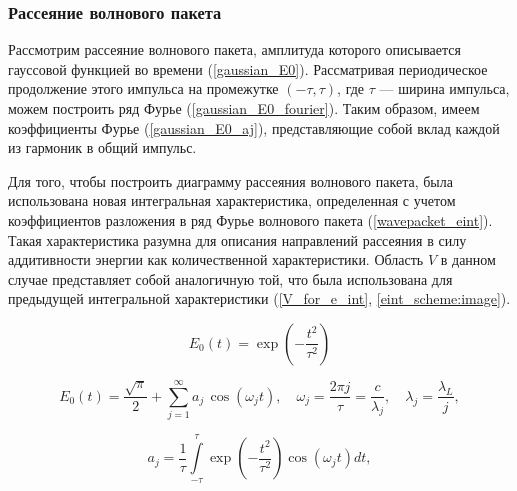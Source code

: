 \subsubsection{Рассеяние волнового пакета}

Рассмотрим рассеяние волнового пакета, амплитуда которого описывается гауссовой функцией во времени (\autoref{gaussian_E0}). Рассматривая периодическое продолжение этого импульса на промежутке $(-\tau, \tau)$, где $\tau$ --- ширина импульса, можем построить ряд Фурье (\autoref{gaussian_E0_fourier}). Таким образом, имеем коэффициенты Фурье (\autoref{gaussian_E0_aj}), представляющие собой вклад каждой из гармоник в общий импульс.

Для того, чтобы построить диаграмму рассеяния волнового пакета, была использована новая интегральная характеристика, определенная с учетом коэффициентов разложения в ряд Фурье волнового пакета (\autoref{wavepacket_eint}). Такая характеристика разумна для описания направлений рассеяния в силу аддитивности энергии как количественной характеристики. Область $V$ в данном случае представляет собой аналогичную той, что была использована для предыдущей интегральной характеристики (\autoref{V_for_e_int}, \autoref{eint_scheme:image}).

    \begin{equation}
        E_0\left( t \right) = \exp{\left( - \frac{t^2}{\tau^2}\right)}
        \label{gaussian_E0}
    \end{equation}

    \begin{equation}
        E_0\left( t \right) = \frac{\sqrt{\pi}}{2} + \sum_{j = 1}^{\infty}{ a_j \, \cos{\left(\omega_j t \right)}}, \quad \omega_j = \frac{2 \pi j}{\tau} = \frac{c}{\lambda_j}, \quad \lambda_{j} = \frac{\lambda_{L}}{j},
        \label{gaussian_E0_fourier}
    \end{equation}

    \begin{equation}
        a_j = \frac{1}{\tau} \int\limits_{-\tau}^{\tau}  \exp{\left( - \frac{t^2}{\tau^2}\right)} \cos{\left(\omega_j t \right)} dt,
        \label{gaussian_E0_aj}
    \end{equation}


